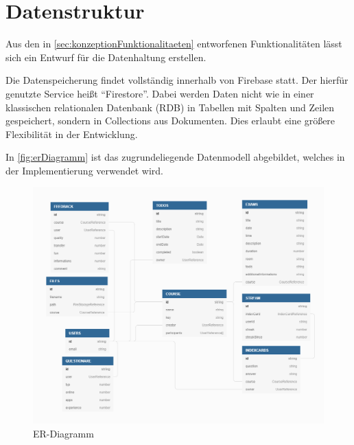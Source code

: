 \section{Datenstruktur}
Aus den in \autoref{sec:konzeptionFunktionalitaeten} entworfenen Funktionalitäten lässt sich ein Entwurf für die Datenhaltung erstellen.

Die Datenspeicherung findet vollständig innerhalb von Firebase statt.
Der hierfür genutzte Service heißt \enquote{Firestore}.
Dabei werden Daten nicht wie in einer klassischen relationalen Datenbank (\ac{RDB}) in Tabellen mit Spalten und Zeilen gespeichert, sondern in Collections aus Dokumenten. Dies erlaubt eine größere Flexibilität in der Entwicklung.


In \autoref{fig:erDiagramm} ist das zugrundeliegende Datenmodell abgebildet, welches in der Implementierung verwendet wird.

\begin{figure}[ht!] 
    \begin{center}
        \includegraphics[width=\textwidth]{img/Integrationsseminar ER.png}
        \caption{ER-Diagramm}
        \label{fig:erDiagramm}
    \end{center}
\end{figure}






